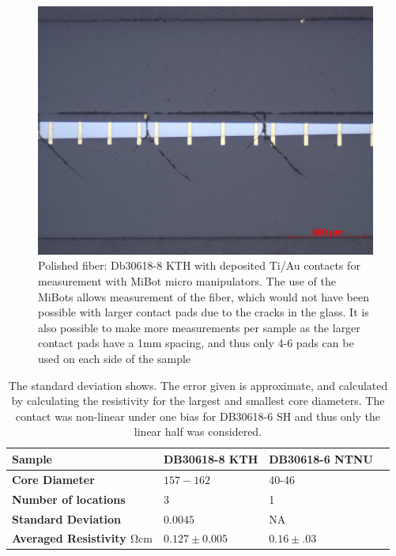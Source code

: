 \begin{figure}
    \centering
    \includegraphics[width=\textwidth]{fig/Results/kthdb30618-8.jpg}
    \caption{Polished fiber: Db30618-8 KTH with deposited Ti/Au contacts for measurement with MiBot micro manipulators. The use of the MiBots allows measurement of the fiber, which would not have been possible with larger contact pads due to the cracks in the glass. It is also possible to make more measurements per sample as the larger contact pads have a 1mm spacing, and thus only 4-6 pads can be used on each side of the sample}
    \label{fig:db30618KTH}
\end{figure}


\begin{table}[!h]
\begin{center}
\begin{tabular}{ | l | l | l | l |}
\hline
\textbf{Sample}& DB30618-8 KTH & DB30618-6 NTNU \\ \hline
\textbf{Core Diameter}& $157-162$ & 40-46 \\\hline
\textbf{Number of locations}& 3&1 \\\hline
\textbf{Standard Deviation}& $0.0045$& NA \\\hline
\textbf{Averaged Resistivity $\si{\ohm \cm}$}&$0.127 \pm 0.005$& $0.16 \pm .03$  \\\hline
\end{tabular}
\end{center}
\caption{The standard deviation shows. The error given is approximate, and calculated by calculating the resistivity for the largest and smallest core diameters. The contact was non-linear under one bias for DB30618-6 SH and thus only the linear half was considered. }
\label{Tabmb25}
\end{table}
\FloatBarrier


